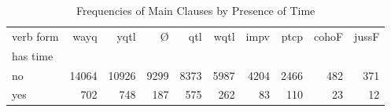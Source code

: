 \begin{table}[htbp!]
\centering
\caption{Frequencies of Main Clauses by Presence of Time}
\label{table:main_verb_ct}
\begin{tabular}{lrrrrrrrrr}
\toprule
verb form &   wayq &   yqtl &     Ø &   qtl &  wqtl &  impv &  ptcp &  cohoF &  jussF \\
has time &        &        &       &       &       &       &       &        &        \\
\midrule
no       &  14064 &  10926 &  9299 &  8373 &  5987 &  4204 &  2466 &    482 &    371 \\
yes      &    702 &    748 &   187 &   575 &   262 &    83 &   110 &     23 &     12 \\
\bottomrule
\end{tabular}
\end{table}
